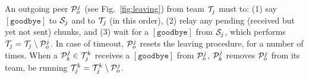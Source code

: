 \begin{figure*}
  \caption{Peer leaving.\label{fig:leaving}}
\end{figure*}
An outgoing peer ${\cal P}^j_o$ (see Fig.~\ref{fig:leaving}) from team
${\cal T}_j$ must to: (1) say $[\mathtt{goodbye}]$ to ${\cal S}_j$ and
to ${\cal T}_j$
(in this order), (2) relay any pending (received but yet not sent)
chunks, and (3) wait for a $[\mathtt{goodbye}]$ from ${\cal S}_j$,
which performs ${\cal T}_j = {\cal T}_j \setminus {\cal P}^j_o$. In
case of timeout, ${\cal P}^j_o$ resets the leaving procedure, for a
number of times. When a ${\cal P}^j_k\in {\cal T}^k_j$
receives a
$[\mathtt{goodbye}]$ from ${\cal P}^j_o$, ${\cal P}^j_k$ removes
${\cal P}^j_o$ from its team, be running ${\cal T}^k_j = {\cal T}^k_j \setminus {\cal P}^j_o$.

\begin{comment}
calls the Procedure \emph{Joining a
  team} (for $K=1$), to find a new neighbor. Finally, ${\cal S}_j$
sends to ${\cal P}_o$ a $[\mathtt{goodbye}]$ and performs ${\cal T}_j
= {\cal T}_j \setminus \{{\cal P}_o\}$.
\end{comment}
